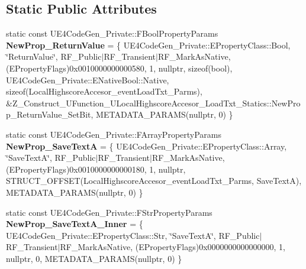 \subsection*{Static Public Attributes}
\begin{DoxyCompactItemize}
\item 
\mbox{\label{struct_z___construct___u_function___u_local_highscore_accesor___load_txt___statics_aad46ef33d64aa65889bb843f96c1c0e1}} 
static const U\+E4\+Code\+Gen\+\_\+\+Private\+::\+F\+Bool\+Property\+Params {\bfseries New\+Prop\+\_\+\+Return\+Value} = \{ U\+E4\+Code\+Gen\+\_\+\+Private\+::\+E\+Property\+Class\+::\+Bool, \char`\"{}Return\+Value\char`\"{}, R\+F\+\_\+\+Public$\vert$R\+F\+\_\+\+Transient$\vert$R\+F\+\_\+\+Mark\+As\+Native, (E\+Property\+Flags)0x0010000000000580, 1, nullptr, sizeof(bool), U\+E4\+Code\+Gen\+\_\+\+Private\+::\+E\+Native\+Bool\+::\+Native, sizeof(\+Local\+Highscore\+Accesor\+\_\+event\+Load\+Txt\+\_\+\+Parms), \&\+Z\+\_\+\+Construct\+\_\+\+U\+Function\+\_\+\+U\+Local\+Highscore\+Accesor\+\_\+\+Load\+Txt\+\_\+\+Statics\+::\+New\+Prop\+\_\+\+Return\+Value\+\_\+\+Set\+Bit, M\+E\+T\+A\+D\+A\+T\+A\+\_\+\+P\+A\+R\+A\+M\+S(nullptr, 0) \}
\item 
\mbox{\label{struct_z___construct___u_function___u_local_highscore_accesor___load_txt___statics_a593e626201b0208e78d9f248316bef8b}} 
static const U\+E4\+Code\+Gen\+\_\+\+Private\+::\+F\+Array\+Property\+Params {\bfseries New\+Prop\+\_\+\+Save\+TextA} = \{ U\+E4\+Code\+Gen\+\_\+\+Private\+::\+E\+Property\+Class\+::\+Array, \char`\"{}Save\+TextA\char`\"{}, R\+F\+\_\+\+Public$\vert$R\+F\+\_\+\+Transient$\vert$R\+F\+\_\+\+Mark\+As\+Native, (E\+Property\+Flags)0x0010000000000180, 1, nullptr, S\+T\+R\+U\+C\+T\+\_\+\+O\+F\+F\+S\+E\+T(\+Local\+Highscore\+Accesor\+\_\+event\+Load\+Txt\+\_\+\+Parms, Save\+Text\+A), M\+E\+T\+A\+D\+A\+T\+A\+\_\+\+P\+A\+R\+A\+M\+S(nullptr, 0) \}
\item 
\mbox{\label{struct_z___construct___u_function___u_local_highscore_accesor___load_txt___statics_a890d5cfc7cd0ddd95dca5f9953fb2b22}} 
static const U\+E4\+Code\+Gen\+\_\+\+Private\+::\+F\+Str\+Property\+Params {\bfseries New\+Prop\+\_\+\+Save\+Text\+A\+\_\+\+Inner} = \{ U\+E4\+Code\+Gen\+\_\+\+Private\+::\+E\+Property\+Class\+::\+Str, \char`\"{}Save\+TextA\char`\"{}, R\+F\+\_\+\+Public$\vert$R\+F\+\_\+\+Transient$\vert$R\+F\+\_\+\+Mark\+As\+Native, (E\+Property\+Flags)0x0000000000000000, 1, nullptr, 0, M\+E\+T\+A\+D\+A\+T\+A\+\_\+\+P\+A\+R\+A\+M\+S(nullptr, 0) \}

\end{DoxyCompactItemize}
